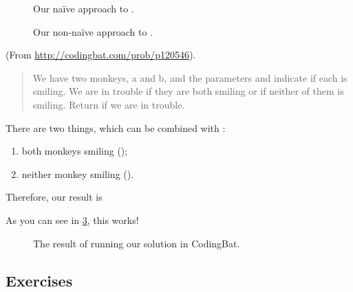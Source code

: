 \begin{figure}[h]
  \centering
  \caption{Our na\"ive approach to .}
  \label{fig:sleep_in-naive}
\end{figure}
\begin{figure}[h]
  \centering
  \caption{Our non-na\"ive approach to .}
  \label{fig:sleep_in}
\end{figure}

\begin{example}
  (From \url{http://codingbat.com/prob/p120546}).

  \begin{quote}
    We have two monkeys, a and b, and the parameters 
    and  indicate if each is smiling. We are in trouble
    if they are both smiling or if neither of them is smiling. Return
     if we are in trouble.
  \end{quote}

  \begin{solution}
    There are two things, which can be combined with :

    \begin{enumerate}
    \item both monkeys smiling ();
    \item neither monkey smiling ().
    \end{enumerate}

    Therefore, our result is


    As you can see in \cref{fig:monkey_trouble}, this works!
  \end{solution}
\end{example}

\begin{figure}[h]
  \centering
  \caption{The result of running our  solution in
    CodingBat.}
  \label{fig:monkey_trouble}
\end{figure}

\subsection{Exercises}

